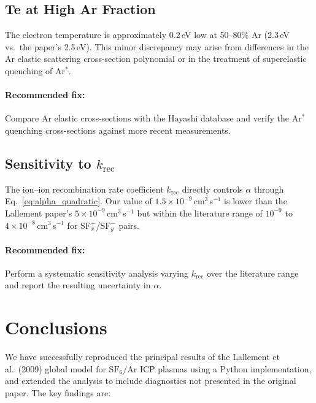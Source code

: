 \documentclass[11pt,a4paper]{article}
\newcommand{\SFsix}{\mathrm{SF}_6}
\newcommand{\Ar}{\mathrm{Ar}}
\begin{document}
\subsection{Te at High Ar Fraction}

The electron temperature is approximately 0.2\,eV low at 50--80\% Ar (2.3\,eV vs.\ the paper's 2.5\,eV).  This minor discrepancy may arise from differences in the Ar elastic scattering cross-section polynomial or in the treatment of superelastic quenching of Ar$^*$.

\paragraph{Recommended fix:} Compare Ar elastic cross-sections with the Hayashi database and verify the Ar$^*$ quenching cross-sections against more recent measurements.

\subsection{Sensitivity to $k_\mathrm{rec}$}

The ion--ion recombination rate coefficient $k_\mathrm{rec}$ directly controls $\alpha$ through Eq.~\eqref{eq:alpha_quadratic}.  Our value of $1.5 \times 10^{-9}$\,cm$^3$\,s$^{-1}$ is lower than the Lallement paper's $5 \times 10^{-9}$\,cm$^3$\,s$^{-1}$ but within the literature range of $10^{-9}$ to $4 \times 10^{-8}$\,cm$^3$\,s$^{-1}$ for SF$_x^+$/SF$_y^-$ pairs.

\paragraph{Recommended fix:} Perform a systematic sensitivity analysis varying $k_\mathrm{rec}$ over the literature range and report the resulting uncertainty in $\alpha$.

\section{Conclusions}

We have successfully reproduced the principal results of the Lallement et al.\ (2009) global model for $\SFsix/\Ar$ ICP plasmas using a Python implementation, and extended the analysis to include diagnostics not presented in the original paper.  The key findings are:
\end{document}
